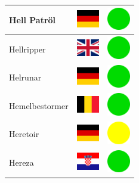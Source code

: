 \documentclass[12pt, a4paper, twoside]{report}
\begin{document}
\begin{center}
\begin{longtable}{|p{5cm}|p{2cm}|p{2cm}|}
 Hell Patröl                                                & \includegraphics[width=1cm]{../4x3/de} &   \includegraphics[width=1cm]{../likes/y} \\ \hline
 Hellripper                                                 & \includegraphics[width=1cm]{../4x3/gb} &   \includegraphics[width=1cm]{../likes/y} \\ \hline
 Helrunar                                                   & \includegraphics[width=1cm]{../4x3/de} &   \includegraphics[width=1cm]{../likes/y} \\ \hline
 Hemelbestormer                                             & \includegraphics[width=1cm]{../4x3/be} &   \includegraphics[width=1cm]{../likes/y} \\ \hline
 Heretoir                                                   & \includegraphics[width=1cm]{../4x3/de} &   \includegraphics[width=1cm]{../likes/m} \\ \hline
 Hereza                                                     & \includegraphics[width=1cm]{../4x3/hr} &   \includegraphics[width=1cm]{../likes/y} \\ \hline

\end{longtable}
\end{center}
\end{document}
